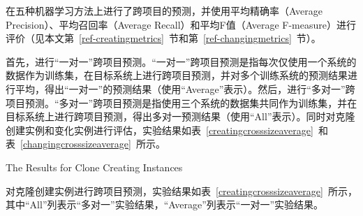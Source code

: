 在五种机器学习方法上进行了跨项目的预测，并使用平均精确率（Average Precision）、平均召回率（Average Recall）和平均F值（Average F-measure）进行评价（见本文第~\ref{ref-creatingmetrics}~节和第~\ref{ref-changingmetrics}~节）。

首先，进行“一对一”跨项目预测。“一对一”跨项目预测是指每次仅使用一个系统的数据作为训练集，在目标系统上进行跨项目预测，并对多个训练系统的预测结果进行平均，得出“一对一”的预测结果（使用“Average”表示）。然后，进行“多对一”跨项目预测。“多对一”跨项目预测是指使用三个系统的数据集共同作为训练集，并在目标系统上进行跨项目预测，得出多对一预测结果（使用“All”表示）。同时对克隆创建实例和变化实例进行评估，实验结果如表~\ref{creatingcrosssizeaverage}~和表~\ref{changingcrosssizeaverage}~所示。

{The Results for Clone Creating Instances}

对克隆创建实例进行跨项目预测，实验结果如表~\ref{creatingcrosssizeaverage}~所示，其中“All”列表示“多对一”实验结果，“Average”列表示“一对一”实验结果。

